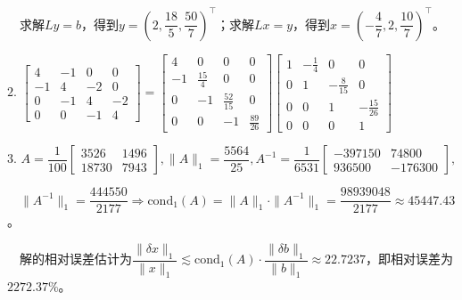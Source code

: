 \documentclass[cn,hazy,green,11pt,normal]{elegantnote}
\begin{document}
    $\quad$求解$Ly=b$，得到$y=\left(2,\dfrac{18}5,\dfrac{50}7\right)^{\top}$；求解$Lx=y$，得到$x=\left(-\dfrac47,2,\dfrac{10}7\right)^{\top}$。

    $2.\,\,\begin{bmatrix}4&-1&0&0\\-1&4&-2&0\\0&-1&4&-2\\0&0&-1&4\end{bmatrix}=\begin{bmatrix}4&0&0&0\\-1&\frac{15}4&0&0\\0&-1&\frac{52}{15}&0\\0&0&-1&\frac{89}{26}\end{bmatrix}\begin{bmatrix}1&-\frac14&0&0\\0&1&-\frac8{15}&0\\0&0&1&-\frac{15}{26}\\0&0&0&1\end{bmatrix}$

    $3.\,\,A=\dfrac1{100}\begin{bmatrix}3526&1496\\18730&7943\end{bmatrix},\|A\|_1=\dfrac{5564}{25},A^{-1}=\dfrac1{6531}\begin{bmatrix}-397150&74800\\936500&-176300\end{bmatrix},$

    $\quad\|A^{-1}\|_1=\dfrac{444550}{2177}\Rightarrow \mathrm{cond}_1(A)=\|A\|_1\cdot\|A^{-1}\|_1=\dfrac{98939048}{2177}\approx 45447.43$。

    $\quad$解的相对误差估计为$\dfrac{\|\delta x\|_1}{\|x\|_1}\lesssim\mathrm{cond}_1(A)\cdot\dfrac{\|\delta b\|_1}{\|b\|_1}\approx 22.7237$，即相对误差为$2272.37\%$。
\end{document}
